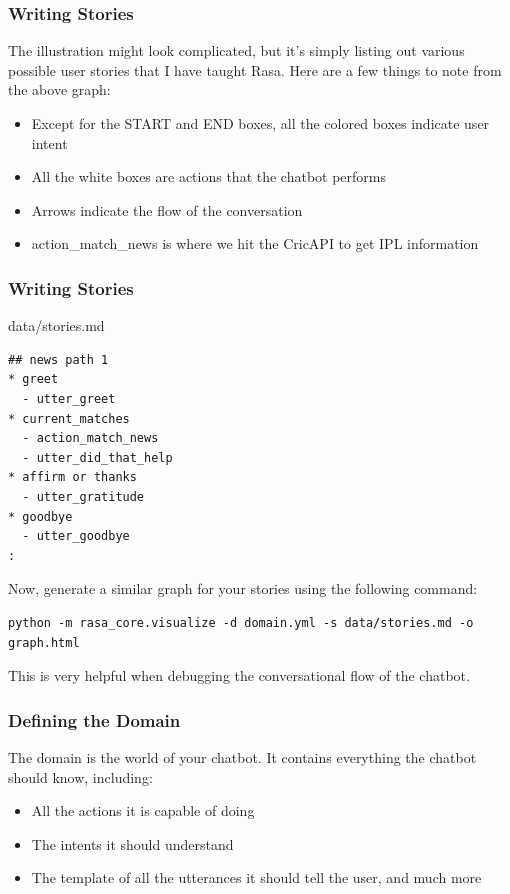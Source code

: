  \begin{frame}[fragile]\frametitle{Writing Stories}

 The illustration might look complicated, but it’s simply listing out various possible user stories that I have taught Rasa. Here are a few things to note from the above graph:
 
 
\begin{itemize}
\item Except for the START and END boxes, all the colored boxes indicate user intent
\item All the white boxes are actions that the chatbot performs
\item  Arrows indicate the flow of the conversation
\item  action\_match\_news is where we hit the CricAPI to get IPL information
\end{itemize}
\end{frame}


\begin{frame}[fragile]\frametitle{Writing Stories}

data/stories.md

\begin{lstlisting}
## news path 1
* greet
  - utter_greet
* current_matches
  - action_match_news
  - utter_did_that_help
* affirm or thanks
  - utter_gratitude
* goodbye
  - utter_goodbye
:
\end{lstlisting}

Now, generate a similar graph for your stories using the following command:

\begin{lstlisting}
python -m rasa_core.visualize -d domain.yml -s data/stories.md -o graph.html
\end{lstlisting}

This is very helpful when debugging the conversational flow of the chatbot.

\end{frame}

 \begin{frame}[fragile]\frametitle{Defining the Domain}

The domain is the world of your chatbot. It contains everything the chatbot should know, including:
 
 
\begin{itemize}
\item All the actions it is capable of doing
\item The intents it should understand
\item The template of all the utterances it should tell the user, and much more
\end{itemize}
\end{frame}

